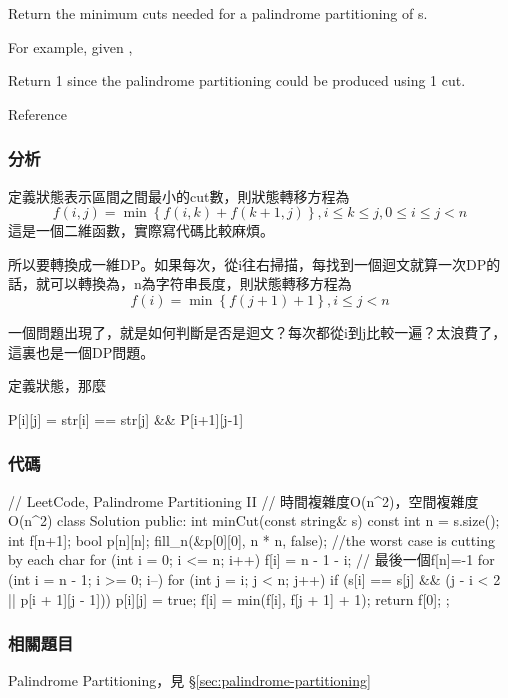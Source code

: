 Return the minimum cuts needed for a palindrome partitioning of s.

For example, given ,

Return 1 since the palindrome partitioning \code{\["aa","b"\]} could be produced using 1 cut.

Reference 


\subsubsection{分析}
定義狀態表示區間\fn{[i,j]}之間最小的cut數，則狀態轉移方程為 
$$
f(i,j)=\min\left\{f(i,k)+f(k+1,j)\right\}, i \leq k \leq j, 0 \leq i \leq j<n
$$
這是一個二維函數，實際寫代碼比較麻煩。
 
所以要轉換成一維DP。如果每次，從i往右掃描，每找到一個迴文就算一次DP的話，就可以轉換為，n為字符串長度，則狀態轉移方程為
$$
f(i)=\min\left\{f(j+1)+1\right\}, i \leq j<n
$$

一個問題出現了，就是如何判斷\fn{[i,j]}是否是迴文？每次都從i到j比較一遍？太浪費了，這裏也是一個DP問題。

定義狀態，那麼
\begin{Code}
P[i][j] = str[i] == str[j] && P[i+1][j-1]
\end{Code}


\subsubsection{代碼}
\begin{Code}
// LeetCode, Palindrome Partitioning II
// 時間複雜度O(n^2)，空間複雜度O(n^2)
class Solution {
public:
    int minCut(const string& s) {
        const int n = s.size();
        int f[n+1];
        bool p[n][n];
        fill_n(&p[0][0], n * n, false);
        //the worst case is cutting by each char
        for (int i = 0; i <= n; i++)
            f[i] = n - 1 - i; // 最後一個f[n]=-1
        for (int i = n - 1; i >= 0; i--) {
            for (int j = i; j < n; j++) {
                if (s[i] == s[j] && (j - i < 2 || p[i + 1][j - 1])) {
                    p[i][j] = true;
                    f[i] = min(f[i], f[j + 1] + 1);
                }
            }
        }
        return f[0];
    }
};
\end{Code}


\subsubsection{相關題目}
\begindot
\item Palindrome Partitioning，見 \S \ref{sec:palindrome-partitioning}
\myenddot


